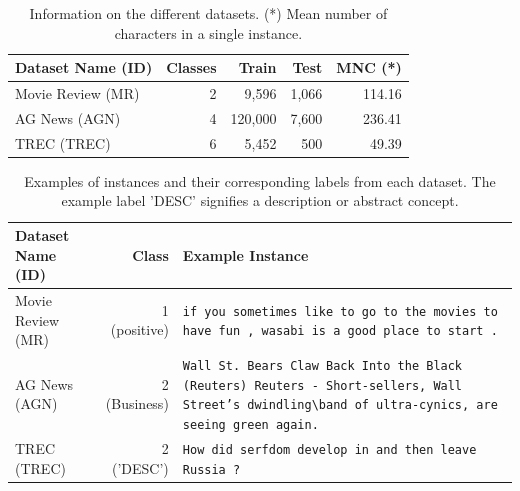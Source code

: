 \documentclass[english,bachelor,ul]{webisthesis} %
\begin{document}
\vspace{1\baselineskip}

\begin{table}[htpb]
    \centering
    \setlength{\tabcolsep}{16pt} %
    \begin{tabular}{@{}lrrrr@{}} %
        \toprule
        \bfseries Dataset Name \scriptsize (ID) & \bfseries Classes & \bfseries Train & \bfseries Test & \bfseries MNC (*) \\
        \midrule
        Movie Review \scriptsize (MR) & 2 & 9,596 & 1,066 & 114.16 \\
        AG News \scriptsize (AGN) & 4 & 120,000 & 7,600 &  236.41 \\
        TREC \scriptsize (TREC) & 6 & 5,452 & 500 & 49.39 \\
        \bottomrule
    \end{tabular}
    \caption{Information on the different datasets. (*) Mean number of characters in a single instance.}
  \label{tab:dataset-table}%
\end{table}

\vspace{1\baselineskip}

\begin{table}[htbp]
    \centering
    \renewcommand{\arraystretch}{1.5}
    \begin{tabular}{@{}lrp{7cm}@{}} 
        \toprule
        \textbf{Dataset Name} \scriptsize (ID) & \textbf{Class} & \textbf{Example Instance} \\
        \midrule
        Movie Review \scriptsize (MR) & 1 (positive) & \texttt{if you sometimes like to go to the movies to have fun , wasabi is a good place to start .} \\
        AG News \scriptsize (AGN) & 2  (Business) & \texttt{Wall St. Bears Claw Back Into the Black (Reuters) Reuters - Short-sellers, Wall Street's dwindling\textbackslash band of ultra-cynics, are seeing green again.} \\
        TREC \scriptsize (TREC) & 2 ('DESC') & \texttt{How did serfdom develop in and then leave Russia ?} \\
        \bottomrule
    \end{tabular}
    \caption{Examples of instances and their corresponding labels from each dataset. The example label 'DESC' signifies a description or abstract concept.}
    \label{tab:dataset-instances}
\end{table}
\end{document}
